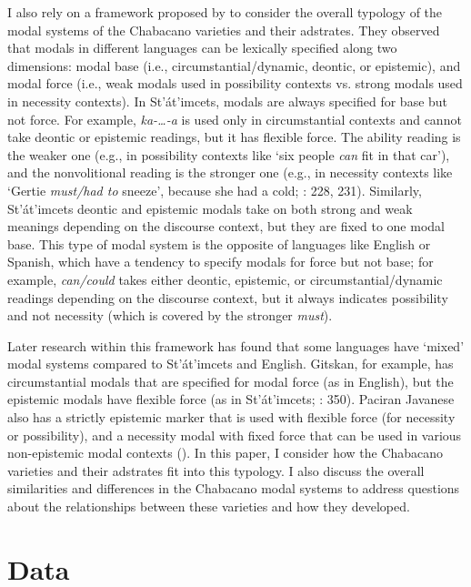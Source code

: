 \documentclass[output=paper,colorlinks,citecolor=brown]{langscibook}
\begin{document}
I also rely on a framework proposed by \citet{MatthewsonDavis2005} to consider the overall typology of the modal systems of the Chabacano varieties and their adstrates. They observed that modals in different languages can be lexically specified along two dimensions: modal base (i.e., circumstantial/dynamic, deontic, or epistemic), and modal force (i.e., weak modals used in possibility contexts vs. strong modals used in necessity contexts). In St’át’imcets, modals are always specified for base but not force. For example, \textit{ka-…-a} is used only in circumstantial contexts and cannot take deontic or epistemic readings, but it has flexible force. The ability reading is the weaker one (e.g., in possibility contexts like ‘six people \textit{can} fit in that car’), and the nonvolitional reading is the stronger one (e.g., in necessity contexts like ‘Gertie \textit{must/had to} sneeze’, because she had a cold; \citealt{DavisRullmann2009}: 228, 231). Similarly, St’át’imcets deontic and epistemic modals take on both strong and weak meanings depending on the discourse context, but they are fixed to one modal base. This type of modal system is the opposite of languages like English or Spanish, which have a tendency to specify modals for force but not base; for example, \textit{can/could} takes either deontic, epistemic, or circumstantial\slash dynamic readings depending on the discourse context, but it always indicates possibility and not necessity (which is covered by the stronger \textit{must}).

Later research within this framework has found that some languages have ‘mixed’ modal systems compared to St’át’imcets and English. Gitskan, for example, has circumstantial modals that are specified for modal force (as in English), but the epistemic modals have flexible force (as in St’át’imcets; \citealt{Matthewson2013}: 350). Paciran Javanese also has a strictly epistemic marker that is used with flexible force (for necessity or possibility), and a necessity modal with fixed force that can be used in various non-epistemic modal contexts (\citealt{VanderKlok2013}). In this paper, I consider how the Chabacano varieties and their adstrates fit into this typology. I also discuss the overall similarities and differences in the Chabacano modal systems to address questions about the relationships between these varieties and how they developed.

\section{Data}\label{sec:lesho:4}
\end{document}
